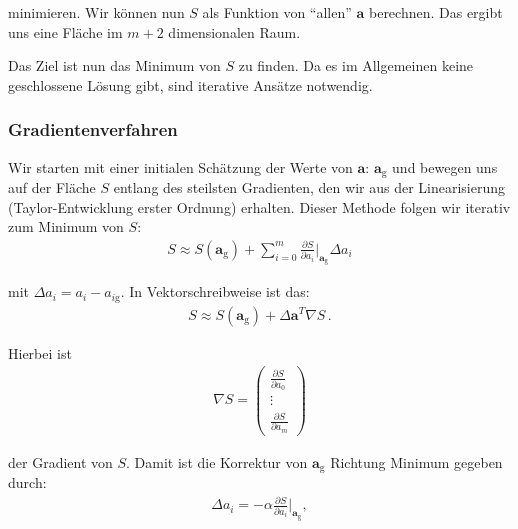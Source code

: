 minimieren. Wir k\"onnen nun $S$ als Funktion von ``allen'' $\boldsymbol{a}$ berechnen. Das ergibt uns eine Fl\"ache im $m + 2$ dimensionalen Raum.


\begin{center}
\begin{tcolorbox}[enhanced,width=6in,drop fuzzy shadow southwest,
    colframe=red!50!black,colback=red!05]
   Das Ziel ist nun das Minimum von $S$ zu finden. Da es im Allgemeinen keine geschlossene L\"osung gibt, sind iterative Ans\"atze notwendig.
\end{tcolorbox}
\end{center}


\subsubsection{Gradientenverfahren}
\label{subsubsec:vl9-1}

Wir starten mit einer initialen Sch\"atzung der Werte von $\boldsymbol{a}$: $\boldsymbol{a}_\mathrm{g}$ und bewegen uns auf der Fl\"ache $S$ entlang des steilsten Gradienten, den wir aus der Linearisierung (Taylor-Entwicklung erster Ordnung) erhalten. Dieser Methode folgen wir iterativ zum Minimum von $S$:
\begin{align}
S \approx S(\boldsymbol{a}_\mathrm{g}) + \sum_{i=0}^m \frac{ \partial S }{ \partial a_i } \bigg|_{\boldsymbol{a}_\mathrm{g}} \Delta a_i
\label{eq:vl9-2}
\end{align}

mit $\Delta a_i = a_i - a_{i\mathrm{g}}$. In Vektorschreibweise ist das:
\begin{align}
S \approx S(\boldsymbol{a}_\mathrm{g}) + \Delta \boldsymbol{a}^T \nabla S\,.
\label{eq:vl9-3}
\end{align}

Hierbei ist
\begin{align}
\nabla S =
\begin{pmatrix}
\frac{\partial S}{\partial a_0} \\
\vdots \\
\frac{\partial S}{\partial a_m}
\end{pmatrix}
\label{eq:vl9-4}
\end{align}

der Gradient von $S$. Damit ist die Korrektur von $\boldsymbol{a}_\mathrm{g}$ Richtung Minimum gegeben durch:
\begin{align}
\Delta a_i = - \alpha \frac{ \partial S }{ \partial a_i } \bigg|_{\boldsymbol{a}_\mathrm{g}},
\label{eq:vl9-5}
\end{align}

